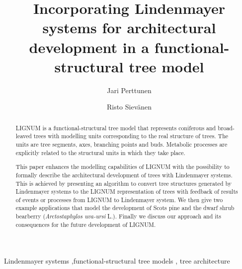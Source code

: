 \documentclass{elsart}
\begin{document}
\begin{frontmatter}


\title{Incorporating Lindenmayer systems for architectural development
in a functional-structural tree model}
\author[Metla]{Jari Perttunen}
\author[Metla]{Risto Siev\"anen}

\address[Metla]{Vantaa   Research  Centre,  Finnish   Forest  Research
Institute, PL 18,  01301 Vantaa, Finland.}




\begin{abstract}
  LIGNUM  is  a   functional-structural  tree  model  that  represents
  coniferous and broad-leaved trees with modelling units corresponding
  to the real structure of  trees.  The units are tree segments, axes,
  branching  points  and  buds.   Metabolic processes  are  explicitly
  related to the structural units in which they take place.
  
  This paper  enhances the modelling  capabilities of LIGNUM  with the
  possibility  to formally describe  the architectural  development of
  trees with  Lindenmayer systems. This  is achieved by  presenting an
  algorithm  to  convert  tree  structures  generated  by  Lindenmayer
  systems to  the LIGNUM  representation of trees with feedback of results of events or 
  processes from LIGNUM to Lindenmayer system. We then  give two
  example applications  that model the  development of Scots  pine and
  the  dwarf shrub  bearberry  (\textit{Arctostaphylos uva-ursi}  L.).
  Finally we discuss our approach  and its consequences for the future
  development of LIGNUM.

\end{abstract}

\begin{keyword}

 Lindenmayer systems \sep functional-structural tree models \sep 
 tree architecture


\end{keyword}

\end{frontmatter}






\end{document}

